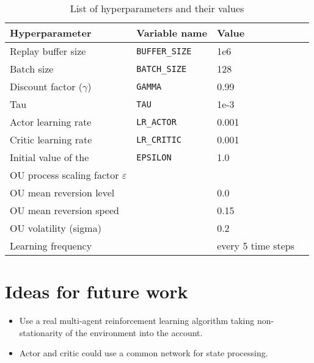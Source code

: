 \documentclass[a4paper,12pt]{amsart}
\begin{document}
\begin{table}
\caption{List of hyperparameters and their values}
\begin{tabular}{|l|l|l|l|}
    \hline
Hyperparameter & Variable name & Value \\ 
    \hline \hline
    Replay buffer size & \texttt{BUFFER\_SIZE} &  1e6 \\ \hline
    Batch size & \texttt{BATCH\_SIZE} &  128  \\  \hline
    Discount factor ($\gamma$) & \texttt{GAMMA} &  0.99 \\ \hline
    Tau & \texttt{TAU} & 1e-3 \\ \hline
    Actor learning rate & \texttt{LR\_ACTOR} & 0.001 \\ \hline
    Critic learning rate & \texttt{LR\_CRITIC} & 0.001 \\ \hline
    Initial value of the & \texttt{EPSILON} & 1.0 \\
    OU process scaling factor $\varepsilon$ && \\ \hline
    OU mean reversion level & & 0.0 \\ \hline
    OU mean reversion speed & & 0.15 \\ \hline
    OU volatility (sigma) & & 0.2 \\ \hline
    Learning frequency & \texttt{} &  every 5 time steps \\ \hline
\end{tabular}
\label{tab:hyperparameters}
\end{table}


\section{Ideas for future work}

\begin{itemize}
    \item Use a real multi-agent reinforcement learning algorithm taking
        non-stationarity of the environment into the account.
    \item Actor and critic could use a common network for state processing. 
\end{itemize}

\nocite{lillicrap2015continuous}
\printbibliography
\end{document}
